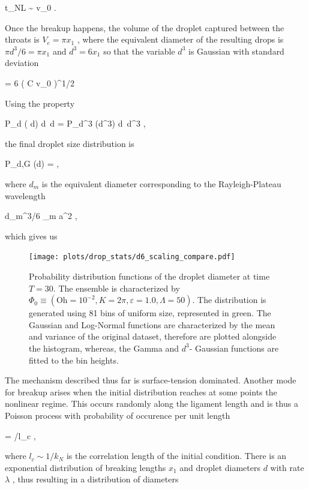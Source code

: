 \be
t_{NL} \sim {} \ln v_0 .
\nd

Once the breakup happens, the volume of the droplet captured between the throats is
$  V_e = \pi  x_1$ , where the equivalent diameter of the resulting drops is
$\pi d^3/6 =  \pi  x_1$  and $d^3 = 6  x_1$ so that
the variable $d^3$ is Gaussian with standard deviation

\be
\sigma = 6  \pi \left(  {C \ln v_0} \right)^{1/2}
\label{d6_std}
\nd

Using the property 

\be
P_d ( d) {\textrm{d}} d = P_{d^3} (d^3) {\textrm{d}} d^3 ,
\nd

the final droplet size distribution is

\be
  P_{d,G} (d) =   \exp{} , 
\label{theory_d6}
\nd

where $d_m$ is the equivalent diameter corresponding to the Rayleigh-Plateau wavelength

\be
  \pi  d_m^3/6 \simeq  \pi \lambda_m a^2 , 
\nd

which gives us 

\be
    
\nd

\begin{figure}
\centering
\texttt{[image: plots/drop\_stats/d6\_scaling\_compare.pdf]}
\caption{Probability distribution functions of the droplet diameter at time $T = 30$. 
	The ensemble is characterized by $\Phi_0 \equiv \left( \textrm{Oh} = 10^{-2}, K = 2\pi , \varepsilon = 1.0 , \Lambda = 50 \right)$. 
The distribution is generated using 81 bins of uniform size, represented in green.  
The Gaussian and Log-Normal functions are characterized by the mean and variance of the original dataset, 
therefore are plotted alongside the histogram, whereas, the Gamma and $d^3$- Gaussian functions are fitted to the bin heights.
	}
\label{d3_gauss}
\end{figure}


The mechanism described thus far is surface-tension dominated. 
Another mode for breakup arises when the initial distribution reaches 
at some points the nonlinear regime. This occurs randomly along
the ligament length and is thus a Poisson process with probability of 
occurence per unit length

\be
\lambda = \exp[{-1/(2 v_0^2)}]/l_c \label{p3} , 
\nd

where $l_c \sim 1/k_N$ is the correlation length of the initial condition. There is an exponential distribution
of breaking lengths $x_1$ and droplet diameters $d$ with rate $\lambda$ , thus resulting in a distribution of diameters

